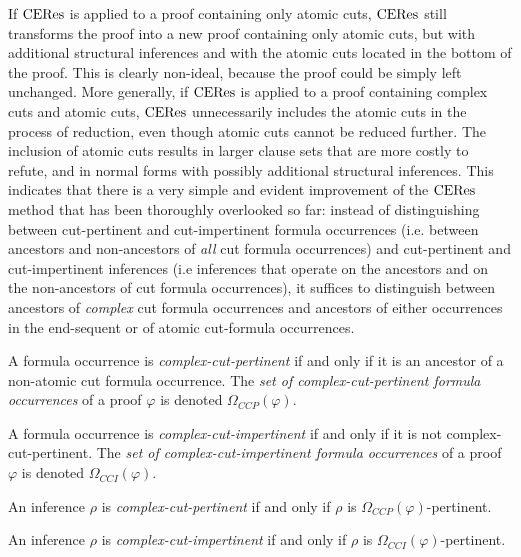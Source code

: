 If $\mathrm{CERes}$ is applied to a proof containing only atomic cuts, $\mathrm{CERes}$ still transforms the proof into a new proof containing only atomic cuts, but with additional structural inferences and with the atomic cuts located in the bottom of the proof. This is clearly non-ideal, because the proof could be simply left unchanged. More generally, if $\mathrm{CERes}$ is applied to a proof containing complex cuts and atomic cuts, $\mathrm{CERes}$ unnecessarily includes the atomic cuts in the process of reduction, even though atomic cuts cannot be reduced further. The inclusion of atomic cuts results in larger clause sets that are more costly to refute, and in normal forms with possibly additional structural inferences. This indicates that there is a very simple and evident improvement of the $\mathrm{CERes}$ method that has been thoroughly overlooked so far: instead of distinguishing between cut-pertinent and cut-impertinent formula occurrences (i.e. between ancestors and non-ancestors of \emph{all} cut formula occurrences) and cut-pertinent and cut-impertinent inferences (i.e inferences that operate on the ancestors and on the non-ancestors of cut formula occurrences), it suffices to distinguish between ancestors of \emph{complex} cut formula occurrences and ancestors of either occurrences in the end-sequent or of atomic cut-formula occurrences.


\newcommand{\occCutPertComplex}[1]{\Omega_{CCP}(#1)}   %
\newcommand{\occCutImpertComplex}[1]{\Omega_{CCI}(#1)}   %
\begin{definition}
\label{definition:ComplexCutPertinenceOccurrences}
A formula occurrence is \emph{complex-cut-pertinent} if and only if it is an ancestor of a non-atomic cut formula occurrence. The \emph{set of complex-cut-pertinent formula occurrences} of a proof $\varphi$ is denoted $\occCutPertComplex{\varphi}$.

A formula occurrence is \emph{complex-cut-impertinent} if and only if it is not complex-cut-pertinent. The \emph{set of complex-cut-impertinent formula occurrences} of a proof $\varphi$ is denoted $\occCutImpertComplex{\varphi}$.
\end{definition}

\begin{definition}
\label{definition:CutPertinenceInferences}
An inference $\rho$ is \emph{complex-cut-pertinent} if and only if $\rho$ is $\occCutPertComplex{\varphi}$-pertinent.

An inference $\rho$ is \emph{complex-cut-impertinent} if and only if $\rho$ is $\occCutImpertComplex{\varphi}$-pertinent.
\end{definition}

